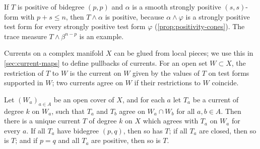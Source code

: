 If $T$ is positive of bidegree $(p,p)$ and $\alpha$ is a smooth strongly positive $(s,s)$-form with $p+s\leq n$, then $T\wedge\alpha$ is positive, because $\alpha\wedge\varphi$ is a strongly positive test form for every strongly positive test form $\varphi$ (\cref{prop:positivity-cones}). The trace measure $T\wedge\beta^{n-p}$ is an example.

Currents on a complex manifold $X$ can be glued from local pieces; we use this in \cref{sec:current-maps} to define pullbacks of currents. For an open set $W\subset X$, the restriction of $T$ to $W$ is the current on $W$ given by the values of $T$ on test forms supported in $W$; two currents agree on $W$ if their restrictions to $W$ coincide.

\begin{lemma}\label{lem:current-gluing}
Let $(W_a)_{a\in A}$ be an open cover of $X$, and for each $a$ let $T_a$ be a current of degree $k$ on $W_a$, such that $T_a$ and $T_b$ agree on $W_a\cap W_b$ for all $a,b\in A$. Then there is a unique current $T$ of degree $k$ on $X$ which agrees with $T_a$ on $W_a$ for every $a$. If all $T_a$ have bidegree $(p,q)$, then so has $T$; if all $T_a$ are closed, then so is $T$; and if $p=q$ and all $T_a$ are positive, then so is $T$.
\end{lemma}
